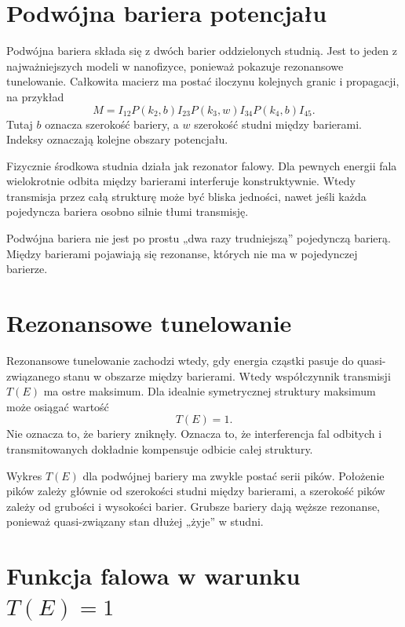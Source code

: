 \section{Podwójna bariera potencjału}

Podwójna bariera składa się z dwóch barier oddzielonych studnią. Jest to jeden z najważniejszych modeli w nanofizyce, ponieważ pokazuje rezonansowe tunelowanie. Całkowita macierz ma postać iloczynu kolejnych granic i propagacji, na przykład
\begin{equation}
    M=I_{12}P(k_2,b)I_{23}P(k_3,w)I_{34}P(k_4,b)I_{45}.
\end{equation}
Tutaj \(b\) oznacza szerokość bariery, a \(w\) szerokość studni między barierami. Indeksy oznaczają kolejne obszary potencjału.

Fizycznie środkowa studnia działa jak rezonator falowy. Dla pewnych energii fala wielokrotnie odbita między barierami interferuje konstruktywnie. Wtedy transmisja przez całą strukturę może być bliska jedności, nawet jeśli każda pojedyncza bariera osobno silnie tłumi transmisję.

\begin{remarkbox}
Podwójna bariera nie jest po prostu „dwa razy trudniejszą” pojedynczą barierą. Między barierami pojawiają się rezonanse, których nie ma w pojedynczej barierze.
\end{remarkbox}

\section{Rezonansowe tunelowanie}

Rezonansowe tunelowanie zachodzi wtedy, gdy energia cząstki pasuje do quasi-związanego stanu w obszarze między barierami. Wtedy współczynnik transmisji \(T(E)\) ma ostre maksimum. Dla idealnie symetrycznej struktury maksimum może osiągać wartość
\begin{equation}
    T(E)=1.
\end{equation}
Nie oznacza to, że bariery zniknęły. Oznacza to, że interferencja fal odbitych i transmitowanych dokładnie kompensuje odbicie całej struktury.

Wykres \(T(E)\) dla podwójnej bariery ma zwykle postać serii pików. Położenie pików zależy głównie od szerokości studni między barierami, a szerokość pików zależy od grubości i wysokości barier. Grubsze bariery dają węższe rezonanse, ponieważ quasi-związany stan dłużej „żyje” w studni.

\section{Funkcja falowa w warunku \texorpdfstring{\(T(E)=1\)}{T(E)=1}}

